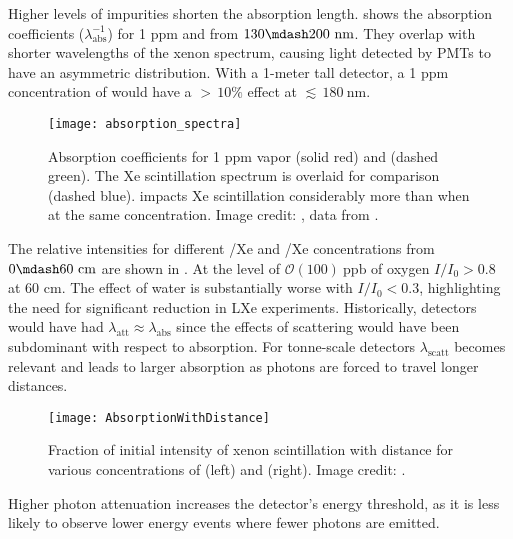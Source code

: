 Higher levels of impurities shorten the absorption
length.   shows the absorption coefficients
($\lambda_{\mathrm{abs}}^{-1}$) for 1 ppm \htwoo and \otwo from $130 \mdash 200\ \mathrm{nm}$.  They overlap with shorter wavelengths
of the xenon spectrum, causing light detected by PMTs to have an asymmetric distribution.  With a
1-meter tall detector, a 1 ppm concentration of \htwoo would have a ${>}\,10\%$ effect at ${\lesssim}\, 180\ \mathrm{nm}$.

\begin{figure}
\centering
\texttt{[image: absorption\_spectra]}
\caption[Absorption coefficients for 1 ppm  vapor and .  The Xe scintillation
spectrum is overlaid for comparison.]{Absorption coefficients for 1 ppm  vapor (solid red) and  (dashed green).  The Xe
scintillation spectrum is overlaid for comparison (dashed blue).   impacts Xe scintillation considerably
more than  when at the same concentration.  Image credit: ,  data from .}
\label{fig:importance_procedure_effects_photons_absorption_coefficents}
\end{figure}

The relative intensities for different /Xe and /Xe concentrations from $0 \mdash 60\ \mathrm{cm}$ are shown in
.  At the level of $\mathcal{O}(100)\ \mathrm{ppb}$ of
oxygen $I / I_0 > 0.8$ at 60 cm.  The effect of water is substantially worse with $I / I_0 < 0.3$, highlighting the need for
significant reduction in LXe experiments.  Historically, detectors would have had $\lambda_{\mathrm{att}} \approx \lambda_{\mathrm{abs}}$
since the effects of scattering would have been subdominant with respect to absorption.  For tonne-scale detectors $\lambda_{\mathrm{scatt}}$
becomes relevant and leads to larger absorption as photons are forced to travel longer distances.

\begin{figure}
\centering
\texttt{[image: AbsorptionWithDistance]}
\caption{Fraction of initial intensity of xenon scintillation with distance for various concentrations of \htwoo (left) and \otwo
(right).  Image credit: .}
\label{fig:importance_procedure_effects_photons_absorption_distance}
\end{figure}

Higher photon attenuation increases the detector's energy threshold, as it is less likely to observe lower energy events where fewer photons
are emitted.



